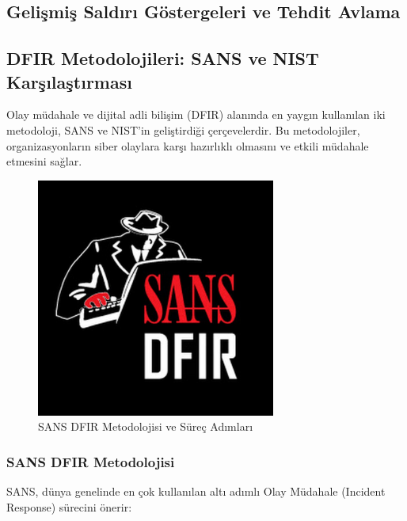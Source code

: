 \subsection{Gelişmiş Saldırı Göstergeleri ve Tehdit Avlama}

\subsection{DFIR Metodolojileri: SANS ve NIST Karşılaştırması}

Olay müdahale ve dijital adli bilişim (DFIR) alanında en yaygın kullanılan iki metodoloji, SANS ve NIST'in geliştirdiği çerçevelerdir. Bu metodolojiler, organizasyonların siber olaylara karşı hazırlıklı olmasını ve etkili müdahale etmesini sağlar.

\begin{figure}[H]
    \centering
    \includegraphics[width=0.7\textwidth]{img/sans-dfir.png}
    \caption{SANS DFIR Metodolojisi ve Süreç Adımları}      
    \label{fig:sans-dfir}
\end{figure}\subsubsection{SANS DFIR Metodolojisi}

SANS, dünya genelinde en çok kullanılan altı adımlı Olay Müdahale (Incident Response) sürecini önerir:

